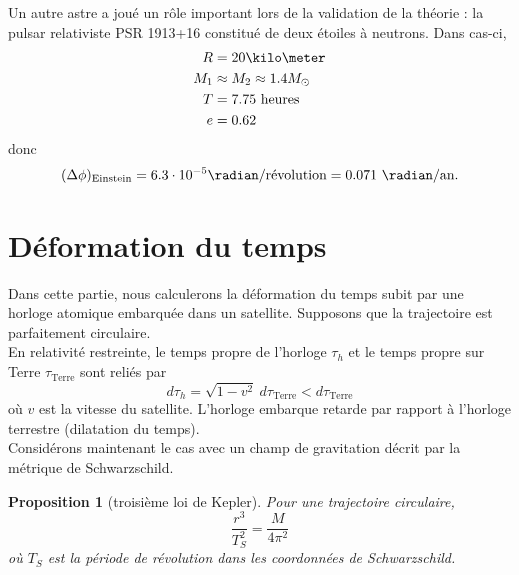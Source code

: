 \documentclass[a4paper,11pt]{report}
\theoremstyle{definition}
\theoremstyle{plain}
\newtheorem{prop}[thm]{Proposition}
\theoremstyle{definition}
\theoremstyle{remark}
\begin{document}
            Un autre astre a joué un rôle important lors de la validation de la théorie : la pulsar relativiste PSR 1913+16 constitué de deux étoiles à neutrons. Dans cas-ci,
            \begin{align}
                R &= 20\kilo\meter\\
                M_1 &\approx M_2 \approx 1.4M_{\odot}\\
                T &= 7.75\text{ heures}\\
                e &= 0.62
            \end{align}
            donc
            \begin{equation}
                (\Delta\phi)_{\text{Einstein}} = 6.3\cdot10^{-5}\radian/\text{révolution} = 0.071~\radian/\text{an}.
            \end{equation}
            
    \section{Déformation du temps}
    
        Dans cette partie, nous calculerons la déformation du temps subit par une horloge atomique embarquée dans un satellite. Supposons que la trajectoire est parfaitement circulaire.\\
        
        En relativité restreinte, le temps propre de l'horloge $\tau_h$ et le temps propre sur Terre $\tau_{\text{Terre}}$ sont reliés par
        \begin{equation}
            d\tau_h = \sqrt{1-v^2}~d\tau_{\text{Terre}} < d\tau_{\text{Terre}}
        \end{equation}
        où $v$ est la vitesse du satellite. L'horloge embarque retarde par rapport à l'horloge terrestre (dilatation du temps).\\
        
        Considérons maintenant le cas avec un champ de gravitation décrit par la métrique de Schwarzschild.
        
        \begin{prop}[troisième loi de Kepler]
            Pour une trajectoire circulaire, 
            \begin{equation}
                \frac{r^3}{T^2_S} = \frac{M}{4\pi^2}
            \end{equation}
            où $T_S$ est la période de révolution dans les coordonnées de Schwarzschild.
        \end{prop}
        
\end{document}
